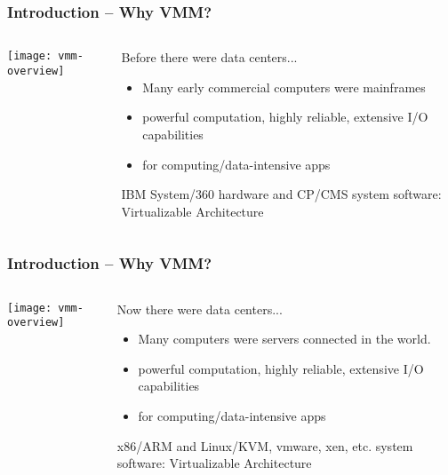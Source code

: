 \begin{frame}%
	\frametitle{Introduction -- Why VMM?}
	
	
	
	\begin{columns}
		
		\begin{column}{.5\textwidth}
			
			\texttt{[image: vmm-overview]}
			
		\end{column}
		
		\begin{column}{.5\textwidth}
		
		Before there were data centers... 
		\begin{itemize}
			\item Many early commercial computers were mainframes
			\item powerful computation, highly reliable, extensive I/O capabilities
			\item for computing/data-intensive  apps 
			
		\end{itemize} 	
        IBM	System/360 hardware and CP/CMS system software: Virtualizable Architecture
		\end{column}
		
		
	\end{columns}
		
\end{frame}


\begin{frame}%
	\frametitle{Introduction -- Why VMM?}
	
	
	
	\begin{columns}
		
		\begin{column}{.5\textwidth}
			
			\texttt{[image: vmm-overview]}
			
		\end{column}
		
		\begin{column}{.5\textwidth}
			
			Now there were data centers... 
			\begin{itemize}
				\item Many computers were servers connected in the world.
				\item powerful computation, highly reliable, extensive I/O capabilities
				\item for computing/data-intensive apps 

				
			\end{itemize} 	
			 x86/ARM and Linux/KVM, vmware, xen, etc. system software: Virtualizable Architecture
		\end{column}
		
		
	\end{columns}
	
\end{frame}

